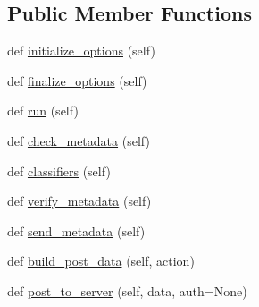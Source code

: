 \subsection*{Public Member Functions}
\begin{DoxyCompactItemize}
\item 
def \hyperlink{classsetuptools_1_1__distutils_1_1command_1_1register_1_1register_acaca5affa3cdf79cdb2a0f74613b599f}{initialize\+\_\+options} (self)
\item 
def \hyperlink{classsetuptools_1_1__distutils_1_1command_1_1register_1_1register_ab089f0f719ee924c40f50a7bd86bbe0d}{finalize\+\_\+options} (self)
\item 
def \hyperlink{classsetuptools_1_1__distutils_1_1command_1_1register_1_1register_abd5bb7740da36e4892bc45621a73d781}{run} (self)
\item 
def \hyperlink{classsetuptools_1_1__distutils_1_1command_1_1register_1_1register_a7dda2527145751be8f5082bf218d4f0b}{check\+\_\+metadata} (self)
\item 
def \hyperlink{classsetuptools_1_1__distutils_1_1command_1_1register_1_1register_a8027debaac20f9b623e972075bcc27b4}{classifiers} (self)
\item 
def \hyperlink{classsetuptools_1_1__distutils_1_1command_1_1register_1_1register_a38fec5419a17be2c6ccc37e2072c9993}{verify\+\_\+metadata} (self)
\item 
def \hyperlink{classsetuptools_1_1__distutils_1_1command_1_1register_1_1register_ad203abb770efa5f2dc87d17fe4e8fabb}{send\+\_\+metadata} (self)
\item 
def \hyperlink{classsetuptools_1_1__distutils_1_1command_1_1register_1_1register_a2b1be4dbf026a4bf54475d62346b20f8}{build\+\_\+post\+\_\+data} (self, action)
\item 
def \hyperlink{classsetuptools_1_1__distutils_1_1command_1_1register_1_1register_a9f0256a80ddfc1feaa46c722821f94d4}{post\+\_\+to\+\_\+server} (self, data, auth=None)
\end{DoxyCompactItemize}
